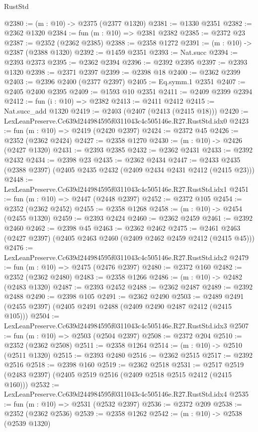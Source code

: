 \begin{lexlean}{RustStd}
\begin{coremodule}
@2380 := (m : @10) -> @2375 (@2377 @1320)
@2381 := @1330 @2351
@2382 := @2362 @1320
@2384 := fun (m : @10) => @2381 @2382
@2385 := @2372 @23
@2387 := @2352 (@2362 @2385)
@2388 := @2358 @1272
@2391 := (m : @10) -> @2387 (@2388 @1320)
@2392 := @1459 @2351
@2393 := Nat.succ
@2394 := @2393 @2373
@2395 := @2362 @2394
@2396 := @2392 @2395
@2397 := @2393 @1320
@2398 := @2371 @2397
@2399 := @2398 @18
@2400 := @2362 @2399
@2403 := @2396 @2400 (@2377 @2397)
@2405 := Eq.symm.{1} @2351
@2407 := @2405 @2400 @2395
@2409 := @1593 @10 @2351
@2411 := @2409 @2399 @2394
@2412 := fun (i : @10) => @2382
@2413 := @2411 @2412
@2415 := Nat.succ_add @1320
@2419 := @2403 (@2407 (@2413 (@2415 @18)))
@2420 := LexLeanPreserve.Cc639d244984595f0311043c4c505146e.R27.RustStd.idx0
@2423 := fun (m : @10) => @2419 (@2420 @2397)
@2424 := @2372 @45
@2426 := @2352 (@2362 @2424)
@2427 := @2358 @1270
@2430 := (m : @10) -> @2426 (@2427 @1320)
@2431 := @2393 @2385
@2432 := @2362 @2431
@2433 := @2392 @2432
@2434 := @2398 @23
@2435 := @2362 @2434
@2447 := @2433 @2435 (@2388 @2397) (@2405 @2435 @2432 (@2409 @2434 @2431 @2412 (@2415 @23)))
@2448 := LexLeanPreserve.Cc639d244984595f0311043c4c505146e.R27.RustStd.idx1
@2451 := fun (m : @10) => @2447 (@2448 @2397)
@2452 := @2372 @105
@2454 := @2352 (@2362 @2452)
@2455 := @2358 @1268
@2458 := (m : @10) -> @2454 (@2455 @1320)
@2459 := @2393 @2424
@2460 := @2362 @2459
@2461 := @2392 @2460
@2462 := @2398 @45
@2463 := @2362 @2462
@2475 := @2461 @2463 (@2427 @2397) (@2405 @2463 @2460 (@2409 @2462 @2459 @2412 (@2415 @45)))
@2476 := LexLeanPreserve.Cc639d244984595f0311043c4c505146e.R27.RustStd.idx2
@2479 := fun (m : @10) => @2475 (@2476 @2397)
@2480 := @2372 @160
@2482 := @2352 (@2362 @2480)
@2483 := @2358 @1266
@2486 := (m : @10) -> @2482 (@2483 @1320)
@2487 := @2393 @2452
@2488 := @2362 @2487
@2489 := @2392 @2488
@2490 := @2398 @105
@2491 := @2362 @2490
@2503 := @2489 @2491 (@2455 @2397) (@2405 @2491 @2488 (@2409 @2490 @2487 @2412 (@2415 @105)))
@2504 := LexLeanPreserve.Cc639d244984595f0311043c4c505146e.R27.RustStd.idx3
@2507 := fun (m : @10) => @2503 (@2504 @2397)
@2508 := @2372 @204
@2510 := @2352 (@2362 @2508)
@2511 := @2358 @1264
@2514 := (m : @10) -> @2510 (@2511 @1320)
@2515 := @2393 @2480
@2516 := @2362 @2515
@2517 := @2392 @2516
@2518 := @2398 @160
@2519 := @2362 @2518
@2531 := @2517 @2519 (@2483 @2397) (@2405 @2519 @2516 (@2409 @2518 @2515 @2412 (@2415 @160)))
@2532 := LexLeanPreserve.Cc639d244984595f0311043c4c505146e.R27.RustStd.idx4
@2535 := fun (m : @10) => @2531 (@2532 @2397)
@2536 := @2372 @209
@2538 := @2352 (@2362 @2536)
@2539 := @2358 @1262
@2542 := (m : @10) -> @2538 (@2539 @1320)

\end{coremodule}
\end{lexlean}
